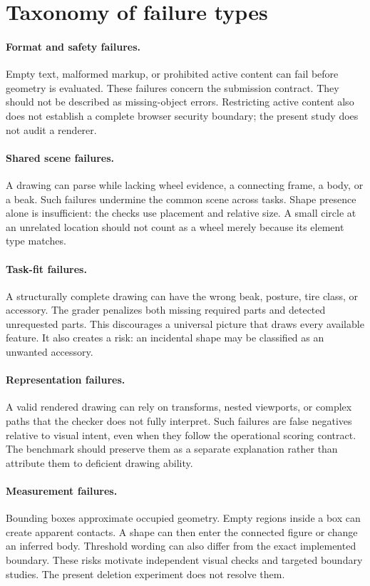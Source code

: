 \documentclass{article}
\begin{document}
\section{Taxonomy of failure types}
\paragraph{Format and safety failures.} Empty text, malformed markup, or prohibited active content can fail before geometry is evaluated. These failures concern the submission contract. They should not be described as missing-object errors. Restricting active content also does not establish a complete browser security boundary; the present study does not audit a renderer.
\paragraph{Shared scene failures.} A drawing can parse while lacking wheel evidence, a connecting frame, a body, or a beak. Such failures undermine the common scene across tasks. Shape presence alone is insufficient: the checks use placement and relative size. A small circle at an unrelated location should not count as a wheel merely because its element type matches.
\paragraph{Task-fit failures.} A structurally complete drawing can have the wrong beak, posture, tire class, or accessory. The grader penalizes both missing required parts and detected unrequested parts. This discourages a universal picture that draws every available feature. It also creates a risk: an incidental shape may be classified as an unwanted accessory.
\paragraph{Representation failures.} A valid rendered drawing can rely on transforms, nested viewports, or complex paths that the checker does not fully interpret. Such failures are false negatives relative to visual intent, even when they follow the operational scoring contract. The benchmark should preserve them as a separate explanation rather than attribute them to deficient drawing ability.
\paragraph{Measurement failures.} Bounding boxes approximate occupied geometry. Empty regions inside a box can create apparent contacts. A shape can then enter the connected figure or change an inferred body. Threshold wording can also differ from the exact implemented boundary. These risks motivate independent visual checks and targeted boundary studies. The present deletion experiment does not resolve them.
\end{document}

